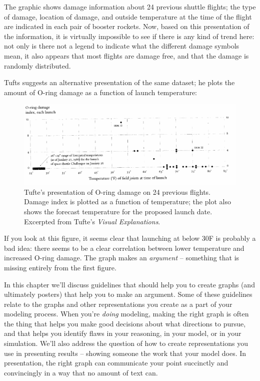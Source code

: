The graphic shows damage information about 24 previous shuttle flights; the type of damage, location of damage, and outside temperature at the time of the flight are indicated in each pair of booster rockets.  Now, based on this presentation of the information, it is virtually impossible to see if there is any kind of trend here:  not only is there not a legend to indicate what the different damage symbols mean, it also appears that most flights are damage free, and that the damage is randomly distributed.

Tufts suggests an alternative presentation  of the same dataset; he plots the amount of O-ring damage as a function of launch temperature:

\begin{figure}[h!]
\includegraphics[width=7in]{figs/Thiokol2}
\caption{Tufte's presentation of O-ring damage on 24 previous flights.  Damage index is plotted as a function of temperature; the plot also shows the forecast temperature for the proposed launch date.  Excerpted from Tufte's {\it Visual Explanations}.}
\end{figure}

If you look at this figure, it seems clear that launching at below 30\textdegree F is probably a bad idea: there seems to be a clear correlation between lower temperature and increased O-ring damage.  The graph makes an {\it argument} -- something that is missing entirely from the first figure.

In this chapter we'll discuss guidelines that should help you to create graphs (and ultimately posters) that help you to make an argument.  Some of these guidelines relate to the graphs and other representations you create as a part of your modeling process.  When you're {\it doing} modeling, making the right graph is often the thing that helps you make good decisions about what directions to pursue, and that helps you identify flaws in your reasoning, in your model, or in your simulation.  We'll also address the question of how to create representations you use in presenting results -- showing someone the work that your model does.  In presentation, the right graph can communicate your point succinctly and convincingly in a way that no amount of text can.

